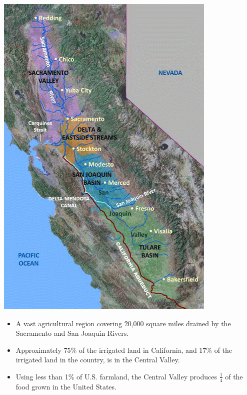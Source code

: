 \documentclass[oneside,a4paper,11pt,explicit]{book}
\begin{document}
\begin{tcolorbox}[colback=yellow!5!white,colframe=IceCreamLeaf,title=\textbf{California's Central Valley}]
	\begin{multicols}{2}

	\centerline{\includegraphics[width=\columnwidth]{CentralValleyUSGS.png}}
	\columnbreak
		\begin{itemize}
			\item A vast agricultural region covering 20,000 square miles drained by the Sacramento and San Joaquin Rivers.
			\item Approximately 75\% of the irrigated land in California, and 17\% of the irrigated land in the country, is in the Central Valley.
			\item Using less than 1\% of U.S. farmland, the Central Valley produces $\frac{1}{4}$ of the food grown in the United States.

\end{itemize}
\end{multicols}
\end{tcolorbox}
\end{document}
